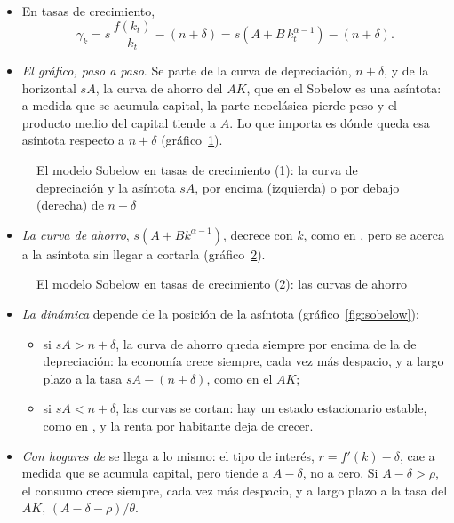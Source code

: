 \documentclass[11pt]{article}
\begin{document}
\begin{itemize}
\item En tasas de crecimiento,
  \begin{equation}
  \gamma_k=s\,\frac{f(k_t)}{k_t}-(n+\delta)=s\left(A+B\,k_t^{\alpha-1}\right)-(n+\delta).\label{eq:sobelow}
  \end{equation}
\item \emph{El gráfico, paso a paso}. Se parte de la curva de depreciación, $n+\delta$, y de la horizontal $sA$, la curva de ahorro del $AK$, que en el Sobelow es una asíntota: a medida que se acumula capital, la parte neoclásica pierde peso y el producto medio del capital tiende a $A$. Lo que importa es dónde queda esa asíntota respecto a $n+\delta$ (gráfico~\ref{fig:sobelow-1}).
\end{itemize}

\begin{figure}[H]
\centering
\caption{El modelo Sobelow en tasas de crecimiento (1): la curva de depreciación y la asíntota $sA$, por encima (izquierda) o por debajo (derecha) de $n+\delta$}\label{fig:sobelow-1}
\end{figure}

\begin{itemize}
\item \emph{La curva de ahorro}, $s(A+Bk^{\alpha-1})$, decrece con $k$, como en , pero se acerca a la asíntota sin llegar a cortarla (gráfico~\ref{fig:sobelow-2}).
\end{itemize}

\begin{figure}[H]
\centering
\caption{El modelo Sobelow en tasas de crecimiento (2): las curvas de ahorro}\label{fig:sobelow-2}
\end{figure}

\begin{itemize}
\item \emph{La dinámica} depende de la posición de la asíntota (gráfico~\ref{fig:sobelow}):
  \begin{itemize}
  \item si $sA>n+\delta$, la curva de ahorro queda siempre por encima de la de depreciación: la economía crece siempre, cada vez más despacio, y a largo plazo a la tasa $sA-(n+\delta)$, como en el $AK$;
  \item si $sA<n+\delta$, las curvas se cortan: hay un estado estacionario estable, como en , y la renta por habitante deja de crecer.
  \end{itemize}
\item \emph{Con hogares de } se llega a lo mismo: el tipo de interés, $r=f'(k)-\delta$, cae a medida que se acumula capital, pero tiende a $A-\delta$, no a cero. Si $A-\delta>\rho$, el consumo crece siempre, cada vez más despacio, y a largo plazo a la tasa del $AK$, $(A-\delta-\rho)/\theta$\nocite{JonesManuelli1990}.
\end{itemize}
\end{document}
